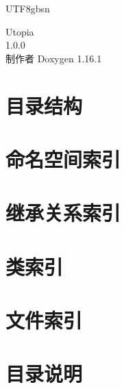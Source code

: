 \documentclass[twoside]{book}
\newcommand{\+}{\discretionary{\mbox{\scriptsize$\hookleftarrow$}}{}{}}
\newcommand{\clearemptydoublepage}{%
    \newpage{\pagestyle{empty}\cleardoublepage}%
  }
\begin{document}
  \raggedbottom
  \begin{CJK}{UTF8}{gbsn}
    \hypersetup{pageanchor=false,
                bookmarksnumbered=true,
                pdfencoding=unicode
               }
  \begin{titlepage}
  \vspace*{7cm}
  \begin{center}%
  {\Large Utopia}\\
  [1ex]\large 1.\+0.\+0 \\
  \vspace*{1cm}
  {\large 制作者 Doxygen 1.16.1}\\
  \end{center}
  \end{titlepage}
  \clearemptydoublepage
  \tableofcontents
  \clearemptydoublepage
  \hypersetup{pageanchor=true}
\chapter{目录结构}

\chapter{命名空间索引}

\chapter{继承关系索引}

\chapter{类索引}

\chapter{文件索引}

\chapter{目录说明}


















\end{CJK}
\end{document}
